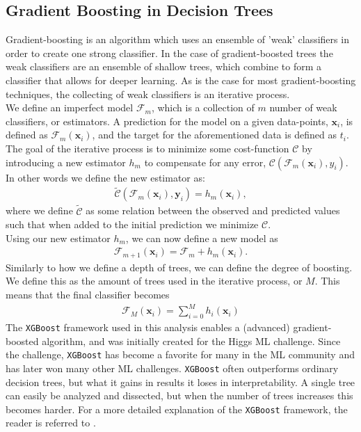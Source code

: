\subsection{Gradient Boosting in Decision Trees}
Gradient-boosting is an algorithm which uses an ensemble of 'weak' 
classifiers in order to create one strong classifier. In the case of gradient-boosted 
trees the weak classifiers are an ensemble of shallow trees, which combine to form a classifier 
that allows for deeper learning. As is the case for most gradient-boosting 
techniques, the collecting of weak classifiers is an iterative process.
\\
We define an imperfect model $\mathcal{F}_m$, which is a collection of $m$ number of weak 
classifiers, or estimators. A prediction for the model on a given data-points, $\textbf{x}_i$, is 
defined as $\mathcal{F}_m(\textbf{x}_i)$, and the target for the aforementioned data is 
defined as $t_i$. The goal of the iterative process is to minimize some cost-function 
$\mathcal{C}$ by introducing a new estimator $h_m$ to compensate for any error, 
$\mathcal{C}(\mathcal{F}_m(\textbf{x}_i), y_i)$. In other words we define the new estimator as:
\begin{align}
    \tilde{\mathcal{C}}(\mathcal{F}_m(\textbf{x}_i), \textbf{y}_i) = h_m(\textbf{x}_i),
\end{align}
where we define $\tilde{\mathcal{C}}$ as some relation between the observed and 
predicted values such that when added to the initial prediction we minimize $\mathcal{C}$.
\\
Using our new estimator $h_m$, we can now define a new model as
\begin{align}
    \mathcal{F}_{m+1}(\textbf{x}_i) = \mathcal{F}_m + h_m (\textbf{x}_i).
\end{align}
Similarly to how we define a depth of trees, we can define the degree of boosting. We define 
this as the amount of trees used in the iterative process, or $M$. This means that the final classifier 
becomes
\begin{align}
    \mathcal{F}_M (\textbf{x}_i) = \sum_{i=0}^M h_i(\textbf{x}_i)
\end{align} 
The \verb!XGBoost! \cite{XGB} framework used in this analysis enables a (advanced) gradient-boosted algorithm, 
and was initially created for the Higgs ML challenge. Since the challenge, \verb!XGBoost! has become 
a favorite for many in the \ac{ML} community and has later won many other ML challenges. \verb!XGBoost! 
often outperforms ordinary decision trees, but what it gains in results it loses in 
interpretability. A single tree can easily be analyzed and dissected, but when the number 
of trees increases this becomes harder. For a more detailed explanation of the \verb!XGBoost! framework,
the reader is referred to \cite{XGB}.
